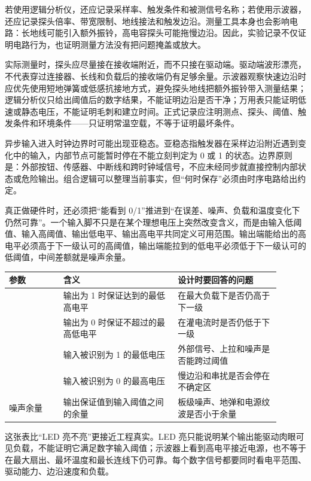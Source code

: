 若使用逻辑分析仪，还应记录采样率、触发条件和被测信号名称；若使用示波器，还应记录探头倍率、带宽限制、地线接法和触发边沿。测量工具本身也会影响电路：长地线可能引入额外振铃，高电容探头可能拖慢边沿。因此，实验记录不仅证明电路行为，也证明测量方法没有把问题掩盖或放大。

实际测量时，探头应尽量接在接收端附近，而不只接在驱动端。驱动端波形漂亮，不代表穿过连接器、长线和负载后的接收端仍有足够余量。示波器观察快速边沿时应优先使用短地弹簧或低感抗接地方式，避免探头地线把额外振铃带入测量结果；逻辑分析仪只给出阈值后的数字结果，不能证明边沿是否干净；万用表只能证明低速或静态电压，不能证明毛刺和建立时间。正式记录应注明测点、探头、阈值、触发条件和环境条件——只证明常温空载，不等于证明最坏条件。

异步输入进入时钟边界时可能出现亚稳态。亚稳态指触发器在采样边沿附近遇到变化中的输入，内部节点可能暂时停在不能立刻判定为 0 或 1 的状态。边界原则是：外部按钮、传感器、中断线和跨时钟域信号，不应未经同步就直接控制内部状态或危险输出。组合逻辑可以整理当前事实，但“何时保存”必须由时序电路给出约定。

真正做硬件时，还必须把“能看到 0/1”推进到“在误差、噪声、负载和温度变化下仍然可靠”。一个输入脚不只是在某个理想电压上突然改变含义，而是由输入低阈值、输入高阈值、输出低电平、输出高电平共同定义可用范围。输出端能给出的高电平必须高于下一级认可的高阈值，输出端能拉到的低电平必须低于下一级认可的低阈值，中间差额就是噪声余量。

\begin{longtable}{L{0.18\linewidth}L{0.38\linewidth}L{0.34\linewidth}}
\toprule
参数 & 含义 & 设计时要回答的问题 \\
\midrule
{} & 输出为 1 时保证达到的最低高电平 & 在最大负载下是否仍高于下一级  \\
 & 输出为 0 时保证不超过的最高低电平 & 在灌电流时是否仍低于下一级  \\
 & 输入被识别为 1 的最低电压 & 外部信号、上拉和噪声是否能跨过阈值 \\
 & 输入被识别为 0 的最高电压 & 慢边沿和串扰是否会停在不确定区 \\
噪声余量 & 输出保证值到输入阈值之间的余量 & 板级噪声、地弹和电源纹波是否小于余量 \\
\bottomrule
\end{longtable}

这张表比“LED 亮不亮”更接近工程真实。LED 亮只能说明某个输出能驱动肉眼可见负载，不能证明它满足数字输入阈值；示波器上看到高电平接近电源，也不等于在最大扇出、最坏温度和最长连线下仍可靠。每个数字信号都要同时看电平范围、驱动能力、边沿速度和负载。

